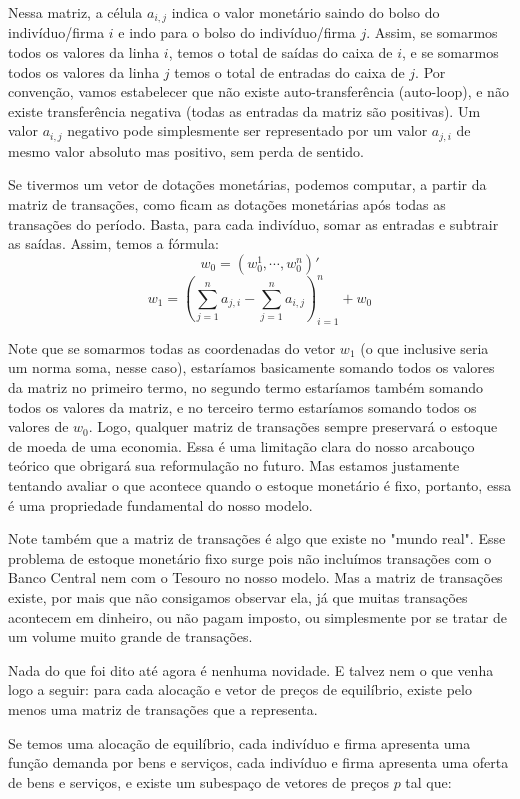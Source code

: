 \documentclass{article}
\begin{document}
\par Nessa matriz, a célula $a_{i,j}$ indica o valor monetário saindo do bolso do indivíduo/firma $i$ e indo para o bolso do indivíduo/firma $j$. Assim, se somarmos todos os valores da linha $i$, temos o total de saídas do caixa de $i$, e se somarmos todos os valores da linha $j$ temos o total de entradas do caixa de $j$. Por convenção, vamos estabelecer que não existe auto-transferência (auto-loop), e não existe transferência negativa (todas as entradas da matriz são positivas). Um valor $a_{i,j}$ negativo pode simplesmente ser representado por um valor $a_{j,i}$ de mesmo valor absoluto mas positivo, sem perda de sentido.
\par Se tivermos um vetor de dotações monetárias, podemos computar, a partir da matriz de transações, como ficam as dotações monetárias após todas as transações do período. Basta, para cada indivíduo, somar as entradas e subtrair as saídas. Assim, temos a fórmula:
$$ w_0 = (w^1_0, \cdots, w^n_0)'$$
$$w_1 = (\sum^n_{j=1}{a_{j,i}} -\sum^n_{j=1}{a_{i,j}}  )^n_{i=1}+w_0$$
\par Note que se somarmos todas as coordenadas do vetor $w_1$ (o que inclusive seria um norma soma, nesse caso), estaríamos basicamente somando todos os valores da matriz no primeiro termo, no segundo termo estaríamos também somando todos os valores da matriz, e no terceiro termo estaríamos somando todos os valores de $w_0$. Logo, qualquer matriz de transações sempre preservará o estoque de moeda de uma economia. Essa é uma limitação clara do nosso arcabouço teórico que obrigará sua reformulação no futuro. Mas estamos justamente tentando avaliar o que acontece quando o estoque monetário é fixo, portanto, essa é uma propriedade fundamental do nosso modelo.
\par Note também que a matriz de transações é algo que existe no "mundo real". Esse problema de estoque monetário fixo surge pois não incluímos transações com o Banco Central nem com o Tesouro no nosso modelo. Mas a matriz de transações existe, por mais que não consigamos observar ela, já que muitas transações acontecem em dinheiro, ou não pagam imposto, ou simplesmente por se tratar de um volume muito grande de transações.
\par Nada do que foi dito até agora é nenhuma novidade. E talvez nem o que venha logo a seguir: para cada alocação e vetor de preços de equilíbrio, existe pelo menos uma matriz de transações que a representa. 
\par Se temos uma alocação de equilíbrio, cada indivíduo e firma apresenta uma função demanda por bens e serviços, cada indivíduo e firma apresenta uma oferta de bens e serviços, e existe um subespaço de vetores de preços $p$ tal que:
\end{document}
